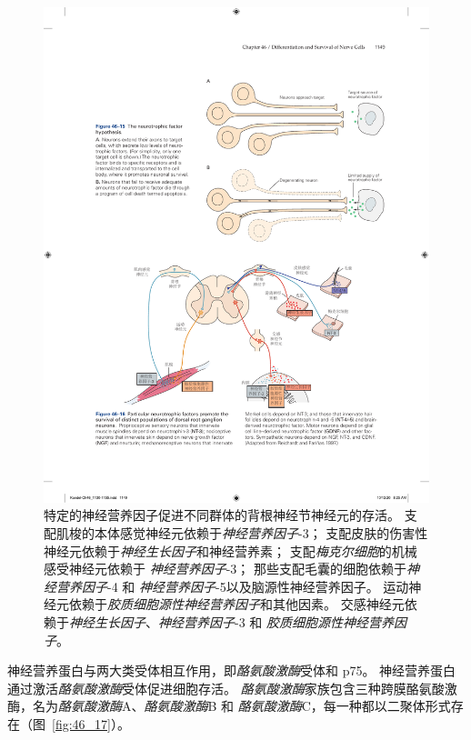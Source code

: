 \begin{figure}[htbp]
	\centering
	\includegraphics[width=1.0\linewidth]{chap46/fig_46_16}
	\caption{特定的神经营养因子促进不同群体的背根神经节神经元的存活。
		支配肌梭的本体感觉神经元依赖于\textit{神经营养因子}-3；
		支配皮肤的伤害性神经元依赖于\textit{神经生长因子}和神经营养素；
		支配\textit{梅克尔细胞}的机械感受神经元依赖于 \textit{神经营养因子}-3；
		那些支配毛囊的细胞依赖于\textit{神经营养因子}-4 和 \textit{神经营养因子}-5以及脑源性神经营养因子。
		运动神经元依赖于\textit{胶质细胞源性神经营养因子}和其他因素。
		交感神经元依赖于\textit{神经生长因子}、\textit{神经营养因子}-3 和 \textit{胶质细胞源性神经营养因子}\cite{reichardt1997neurotrophic}。}
	\label{fig:46_16}
\end{figure}


神经营养蛋白与两大类受体相互作用，即\textit{酪氨酸激酶}受体和 p75。
神经营养蛋白通过激活\textit{酪氨酸激酶}受体促进细胞存活。
\textit{酪氨酸激酶}家族包含三种跨膜酪氨酸激酶，名为\textit{酪氨酸激酶}A、\textit{酪氨酸激酶}B 和 \textit{酪氨酸激酶}C，每一种都以二聚体形式存在（图~\ref{fig:46_17}）。


